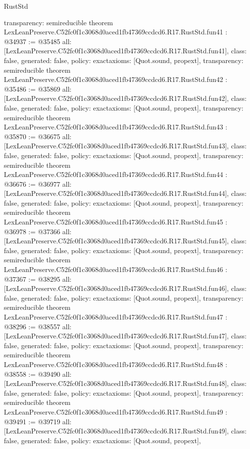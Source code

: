 \begin{lexlean}{RustStd}
\begin{coremodule}
{  transparency: semireducible
}
theorem LexLeanPreserve.C52fc0f1c3068d0aced1fb47369ccdcd6.R17.RustStd.fun41 : @34937 := @35485 {
  all: [LexLeanPreserve.C52fc0f1c3068d0aced1fb47369ccdcd6.R17.RustStd.fun41],
  class: false,
  generated: false,
  policy: exact{axioms: [Quot.sound, propext]},
  transparency: semireducible
}
theorem LexLeanPreserve.C52fc0f1c3068d0aced1fb47369ccdcd6.R17.RustStd.fun42 : @35486 := @35869 {
  all: [LexLeanPreserve.C52fc0f1c3068d0aced1fb47369ccdcd6.R17.RustStd.fun42],
  class: false,
  generated: false,
  policy: exact{axioms: [Quot.sound, propext]},
  transparency: semireducible
}
theorem LexLeanPreserve.C52fc0f1c3068d0aced1fb47369ccdcd6.R17.RustStd.fun43 : @35870 := @36675 {
  all: [LexLeanPreserve.C52fc0f1c3068d0aced1fb47369ccdcd6.R17.RustStd.fun43],
  class: false,
  generated: false,
  policy: exact{axioms: [Quot.sound, propext]},
  transparency: semireducible
}
theorem LexLeanPreserve.C52fc0f1c3068d0aced1fb47369ccdcd6.R17.RustStd.fun44 : @36676 := @36977 {
  all: [LexLeanPreserve.C52fc0f1c3068d0aced1fb47369ccdcd6.R17.RustStd.fun44],
  class: false,
  generated: false,
  policy: exact{axioms: [Quot.sound, propext]},
  transparency: semireducible
}
theorem LexLeanPreserve.C52fc0f1c3068d0aced1fb47369ccdcd6.R17.RustStd.fun45 : @36978 := @37366 {
  all: [LexLeanPreserve.C52fc0f1c3068d0aced1fb47369ccdcd6.R17.RustStd.fun45],
  class: false,
  generated: false,
  policy: exact{axioms: [Quot.sound, propext]},
  transparency: semireducible
}
theorem LexLeanPreserve.C52fc0f1c3068d0aced1fb47369ccdcd6.R17.RustStd.fun46 : @37367 := @38295 {
  all: [LexLeanPreserve.C52fc0f1c3068d0aced1fb47369ccdcd6.R17.RustStd.fun46],
  class: false,
  generated: false,
  policy: exact{axioms: [Quot.sound, propext]},
  transparency: semireducible
}
theorem LexLeanPreserve.C52fc0f1c3068d0aced1fb47369ccdcd6.R17.RustStd.fun47 : @38296 := @38557 {
  all: [LexLeanPreserve.C52fc0f1c3068d0aced1fb47369ccdcd6.R17.RustStd.fun47],
  class: false,
  generated: false,
  policy: exact{axioms: [Quot.sound, propext]},
  transparency: semireducible
}
theorem LexLeanPreserve.C52fc0f1c3068d0aced1fb47369ccdcd6.R17.RustStd.fun48 : @38558 := @39490 {
  all: [LexLeanPreserve.C52fc0f1c3068d0aced1fb47369ccdcd6.R17.RustStd.fun48],
  class: false,
  generated: false,
  policy: exact{axioms: [Quot.sound, propext]},
  transparency: semireducible
}
theorem LexLeanPreserve.C52fc0f1c3068d0aced1fb47369ccdcd6.R17.RustStd.fun49 : @39491 := @39719 {
  all: [LexLeanPreserve.C52fc0f1c3068d0aced1fb47369ccdcd6.R17.RustStd.fun49],
  class: false,
  generated: false,
  policy: exact{axioms: [Quot.sound, propext]},
}
\end{coremodule}
\end{lexlean}
